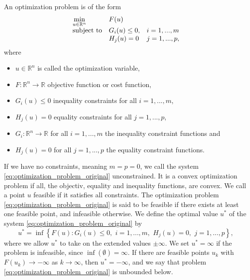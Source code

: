 \documentclass{scrreprt}
\begin{document}
        An optimization problem is of the form
            \begin{equation}
                \begin{array}{l l l}
                    \min\limits_{u \in \mathbb{R}^{n}} & F(u) & \\
                    \textnormal{subject to} & G_{i}(u) \le 0, & i = 1, ..., m \\
                    & H_{j}(u) = 0 & j = 1, ..., p,
                \end{array}
                \label{eq:optimization_problem_original}
            \end{equation}
        where
            \begin{itemize}
                \item $u \in \mathbb{R}^{n}$ is called the optimization variable,
                \item $F: \mathbb{R}^{n} \longrightarrow \mathbb{R}$ objective function or cost function,
                \item $G_{i}(u) \le 0$ inequality constraints for all $i = 1, ..., m$,
                \item $H_{j}(u) = 0$ equality constraints for all $j = 1, ..., p$,
                \item $G_{i}: \mathbb{R}^{n} \longrightarrow \mathbb{R}$ for all $i = 1, ..., m$ the inequality constraint functions and
                \item $H_{j}(u) = 0$ for all $j = 1, ..., p$ the equality constraint functions.
            \end{itemize}
        If we have no constraints, meaning $m = p = 0$, we call the system \ref{eq:optimization_problem_original} unconstrained. It is a convex optimization problem if all, the objectiv, equality and inequality functions, are convex. We call a point $u$ feasible if it satisfies all constraints. The optimization problem \ref{eq:optimization_problem_original} is said to be feasible if there exists at least one feasible point, and infeasible otherwise. We define the optimal value $u^{\ast}$ of the system \ref{eq:optimization_problem_original} by
            $$
                u^{\ast} = \inf \left\{ F(u) : G_{i}(u) \le 0, \,\, i = 1, ..., m, \,\, H_{j}(u) = 0, \,\, j = 1, ..., p \right\},
            $$
        where we allow $u^{\ast}$ to take on the extended values $\pm \infty$. We set $u^{\ast} = \infty$ if the problem is infeasible, since $\inf(\emptyset) = \infty$. If there are feasible points $u_{k}$ with $F(u_{k}) \to -\infty$ as $k \to \infty$, then $u^{\ast} = -\infty$, and we say that problem \ref{eq:optimization_problem_original} is unbounded below.
\end{document}
